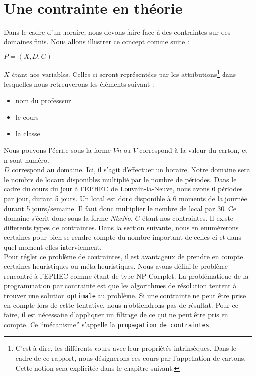 \section{Une contrainte en théorie}
Dans le cadre d'un horaire, nous devons faire face à des contraintes sur des domaines finis. Nous allons illustrer ce concept comme suite :
\begin{center}
$P=(X,D,C)$
\end{center}

$X$ étant nos variables. Celles-ci seront représentées par les attributions\footnote{C'est-à-dire, les différents cours avec leur propriétés intrinsèques. Dans le cadre de ce rapport, nous désignerons ces cours par l'appellation de cartons. Cette notion sera explicitée dans le chapitre suivant.} dans lesquelles nous retrouverons les éléments suivant :
\begin{itemize}
\item nom du professeur
\item le cours
\item la classe
\end{itemize}
Nous pouvons l'écrire sous la forme $Vn$ ou $V$ correspond à la valeur du carton, et n sont numéro.\\
\newline
\indent
	$D$ correspond au domaine. Ici, il s'agit d'effectuer un horaire. Notre domaine sera le nombre de locaux disponibles multiplié par le nombre de périodes. Dans le cadre du cours du jour à l'EPHEC de Louvain-la-Neuve, nous avons 6 périodes par jour, durant 5 jours. Un local est donc disponible à 6 moments de la journée durant 5 jours/semaine. Il faut donc multiplier le nombre de local par 30. Ce domaine s'écrit donc sous la forme $Nl x Np$.
\newline
\indent
	$C$ étant nos contraintes. Il existe différents types de contraintes. Dans la section suivante, nous en énumérerons certaines pour bien se rendre compte du nombre important de celles-ci et dans quel moment elles interviennent.\\
\newline
\indent
Pour régler ce problème de contraintes, il est avantageux de prendre en compte certaines heuristiques ou méta-heuristiques. Nous avons défini le problème rencontré à l'EPHEC comme  étant de type NP-Complet.
\newline
\indent
La problématique de la programmation par contrainte est que les algorithmes de résolution tentent à trouver une solution \texttt{optimale} au problème. Si une contrainte ne peut être prise en compte lors de cette tentative, nous n'obtiendrons pas de résultat. Pour ce faire, il est nécessaire d'appliquer un filtrage de ce qui ne peut être pris en compte. Ce \enquote{mécanisme} s'appelle la \texttt{propagation de contraintes}.
